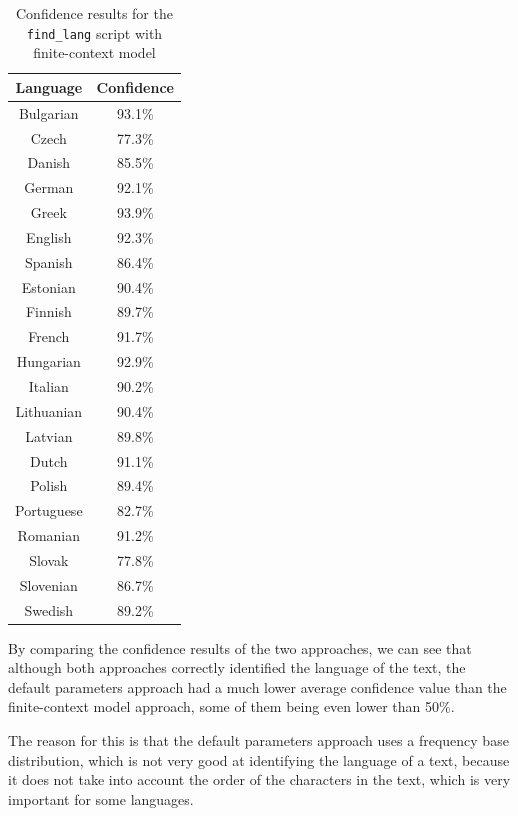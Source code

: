 \documentclass{article}
\begin{document}
\begin{table}
    \centering
    \begin{tabular}{|c|c|}
        \hline
        Language & Confidence \\
        \hline
        Bulgarian & 93.1\% \\
        Czech & 77.3\% \\
        Danish & 85.5\% \\
        German & 92.1\% \\
        Greek & 93.9\% \\
        English & 92.3\% \\
        Spanish & 86.4\% \\
        Estonian & 90.4\% \\
        Finnish & 89.7\% \\
        French & 91.7\% \\
        Hungarian & 92.9\% \\
        Italian & 90.2\% \\
        Lithuanian & 90.4\% \\
        Latvian & 89.8\% \\
        Dutch & 91.1\% \\
        Polish & 89.4\% \\
        Portuguese & 82.7\% \\
        Romanian & 91.2\% \\
        Slovak & 77.8\% \\
        Slovenian & 86.7\% \\
        Swedish & 89.2\% \\
        \hline
    \end{tabular}
    \caption{Confidence results for the \texttt{find\_lang} script with finite-context model}
    \label{tab:find_lang_finite_context_confidence}
\end{table}

By comparing the confidence results of the two approaches, we can see that although both approaches correctly identified the language of the text,
the default parameters approach had a much lower average confidence value than the finite-context model approach, some of them being even lower than 50\%.

The reason for this is that the default parameters approach uses a frequency base distribution, which is not very good at identifying the language of a text,
because it does not take into account the order of the characters in the text, which is very important for some languages.
\end{document}
